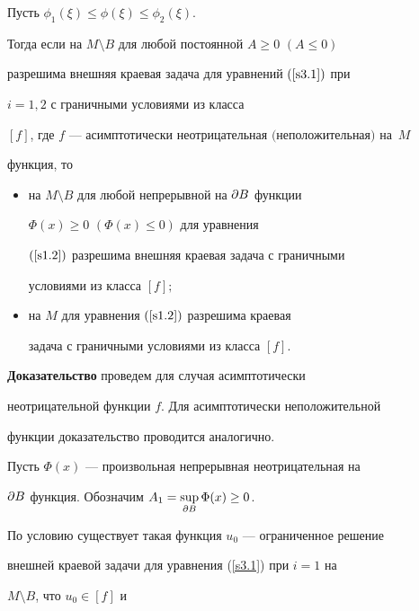  


\begin{thms}\label{th1.3}


Пусть $\phi_1(\xi)\leq\phi(\xi)\leq\phi_2(\xi)$.


Тогда если на $M\setminus B$ для любой постоянной $A\geq0$ $(A\leq0)$


разрешима внешняя краевая задача для уравнений $(\ref{s3.1})$ при


$i=1,2$ с граничными условиями из класса


$[f]$, где $f$ --- асимптотически неотрицательная $($неположительная$)$ на~$M$


функция, то


\begin{itemize}


\item[1)] на $M\setminus B$ для любой непрерывной на $\partial{B}$ функции


$\Phi(x)\geq0$ $(\Phi(x)\leq0)$ для уравнения


$(\ref{s1.2})$ разрешима внешняя краевая задача с граничными


условиями из класса $[f];$


\item[2)] на $M$ для уравнения $(\ref{s1.2})$ разрешима краевая


задача с граничными условиями из класса $[f]$. 


\end{itemize}


\end{thms}








{\bf Доказательство} проведем для случая асимптотически


неотрицательной функции $f$. Для асимптотически неположительной


функции доказательство проводится аналогично.





Пусть $\Phi(x)$ --- произвольная непрерывная неотрицательная на


$\partial{B}$ функция. Обозначим $A_1=\sup\limits_{\partial{B}}\Phi(x)\geq0$.


По условию существует такая функция $u_0$ --- ограниченное решение


внешней краевой задачи для уравнения (\ref{s3.1}) при $i=1$ на


$M\setminus B$, что $u_0\in[f]$ и


